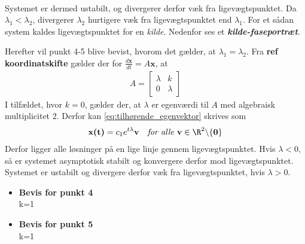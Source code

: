 \begin{bev}
\begin{itemize}
\begin{align*}
    \end{align*}
    Systemet er dermed ustabilt, og divergerer derfor væk fra ligevægtspunktet. 
    Da $\lambda_1<\lambda_2$, divergerer $\lambda_2$ hurtigere væk fra ligevægtspunktet end $\lambda_1$.
    For et sådan system kaldes ligevægtspunktet for en \textit{kilde}. Nedenfor ses et \textbf{\textit{kilde-faseportræt}}.
\end{itemize}
Herefter vil punkt 4-5 blive bevist, hvorom det gælder, at $\lambda_1 = \lambda_2$. Fra \textbf{ref koordinatskifte} gælder der for $\frac{d\textbf{x}}{dt} = A\textbf{x}$, at
    \begin{align*}A=
        \begin{bmatrix}
        \lambda & k \\
        0 & \lambda
        \end{bmatrix}
    \end{align*}
    I tilfældet, hvor $k=0$, gælder der, at $\lambda$ er egenværdi til $A$ med algebraisk multiplicitet 2. Derfor kan \eqref{eq:tilhørende_egenvektor} skrives som 
    \begin{align*}
        \textbf{x(t)} = c_1e^{t\lambda}\textbf{v} \quad \textit{for alle }  \textbf{v}\in\R^2 \backslash \{\textbf{0}\}
    \end{align*}
    Derfor ligger alle løsninger på en lige linje gennem ligevægtspunktet. Hvis $\lambda<0$, så er systemet asymptotisk stabilt og konvergere derfor mod ligevægtspunktet. Systemet er ustabilt og divergere derfor væk fra ligevægtspunktet, hvis $\lambda>0$.
\begin{itemize}
    \item [] \textbf{Bevis for punkt 4}\\
    k=1
    \item [] \textbf{Bevis for punkt 5}\\
    k=1
\end{itemize}
\end{bev}

